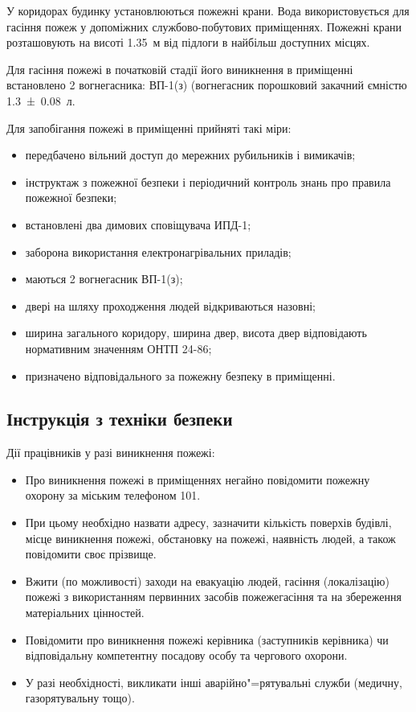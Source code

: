 \documentclass[simple,14pt,utf8,ukrainian]{eskdtext}
\begin{document}
      У коридорах будинку установлюються пожежні крани.
      Вода використовується для гасіння пожеж у допоміжних службово-побутових
      приміщеннях.
      Пожежні крани розташовують на висоті \num{1.35}~м від підлоги в найбільш
      доступних місцях.

      Для гасіння пожежі в початковій стадії його виникнення в приміщенні
      встановлено 2 вогнегасника: ВП-1(з) (вогнегасник порошковий закачний
      ємністю \num{1.3+-0.08}~л.

      Для запобігання пожежі в приміщенні прийняті такі міри:
      \begin{itemize}
        \item передбачено вільний доступ до мережних рубильників і вимикачів;
        \item інструктаж з пожежної безпеки і періодичний контроль знань про
          правила пожежної безпеки;
        \item встановлені два димових сповіщувача ИПД-1;
        \item заборона використання електронагрівальних приладів;
        \item маються 2 вогнегасник ВП-1(з);
        \item двері на шляху проходження людей відкриваються назовні;
        \item ширина загального коридору, ширина двер, висота двер
          відповідають нормативним значенням ОНТП 24-86;
        \item призначено відповідального за пожежну безпеку в приміщенні.
      \end{itemize}
  \subsection{Інструкція з техніки безпеки}
    Дії працівників у разі виникнення пожежі:
    \begin{itemize}
      \item Про виникнення пожежі в приміщеннях негайно повідомити пожежну
        охорону за міським телефоном 101.
      \item При цьому необхідно назвати адресу, зазначити кількість поверхів
        будівлі, місце виникнення пожежі, обстановку на пожежі, наявність
        людей, а також повідомити своє прізвище.
      \item Вжити (по можливості) заходи на евакуацію людей, гасіння
        (локалізацію) пожежі з використанням первинних засобів пожежегасіння
        та на збереження матеріальних цінностей.
      \item Повідомити про виникнення пожежі керівника (заступників керівника)
        чи відповідальну компетентну посадову особу та чергового охорони.
      \item У разі необхідності, викликати інші аварійно"=рятувальні служби
        (медичну, газорятувальну тощо).
    \end{itemize}
  
  
\end{document}
